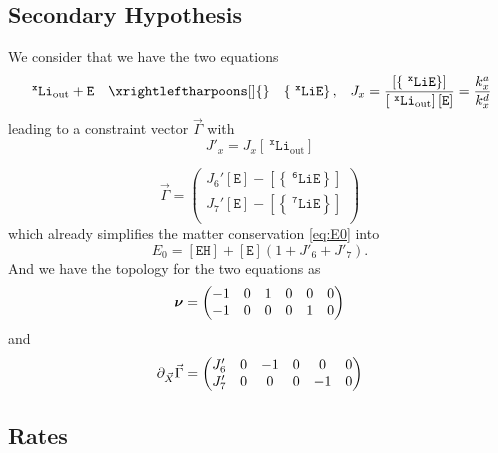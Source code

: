 \documentclass[aps,onecolumn,12pt]{revtex4}
\newcommand{\mychem}[1]{\mathtt{#1}}
\newcommand{\myconc}[1]{\left\lbrack{#1}\right\rbrack}
\newcommand{\spLi}[1]{{~^{\mychem{#1}}\mychem{Li}}}
\newcommand{\spEout}{\mychem{E}}
\newcommand{\Eout}{\myconc{\spEout}}
\newcommand{\spLiE}[1]{\left\lbrace\spLi{#1}\spEout\right\rbrace}
\newcommand{\LiE}[1]{\myconc{\spLiE{#1}}}
\newcommand{\spLiOut}[1]{{\spLi{#1}}_{\mathrm{out}}}
\newcommand{\LiOut}[1]{\myconc{\spLiOut{#1}}}
\newcommand{\spEHin}{\mychem{EH}}
\newcommand{\EHin}{\myconc{\spEHin}}
\newcommand{\mymat}[1]{{\bm{#1}}}
\begin{document}
\subsection{Secondary Hypothesis}
We consider that we have the two equations
\begin{equation}
	\begin{array}{rcll}
	 \spLiOut{x} +  \spEout &  \xrightleftharpoons[]{} & \spLiE{x}, & J_x = \dfrac{\LiE{x}}{\LiOut{x} \Eout} = \dfrac{k_x^a}{k_x^d}\\
	 \end{array}
\end{equation}
leading to a constraint vector $\vec{\Gamma}$
with 
\begin{equation}
	J'_x = J_x \LiOut{x}
\end{equation}

\begin{equation}
\vec{\Gamma} = 
\begin{pmatrix}
	J_6' \Eout - \LiE{6} \\
	J_7' \Eout - \LiE{7} \\
\end{pmatrix}
\end{equation}
which already simplifies the matter conservation \eqref{eq:E0} into
\begin{equation}
	E_0 = \EHin + \Eout \left(1+J'_6+J'_7\right).
\end{equation}
And we have the topology for the two equations as
\begin{equation}
	\label{eq:Nu}
	\mymat{\nu}=\begin{pmatrix}-1 & 0 & 1 & 0 & 0 & 0\cr -1 & 0 & 0 & 0 & 1 & 0\end{pmatrix}
\end{equation}
and
\begin{equation}
	\partial_{\vec{X}}\vec{\Gamma} = 
	\begin{pmatrix}J'_6 & 0 & -1 & 0 & 0 & 0\cr J'_7 & 0 & 0 & 0 & -1 & 0\end{pmatrix}
\end{equation}

\subsection{Rates}
\end{document}
